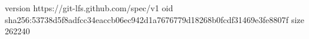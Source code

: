 version https://git-lfs.github.com/spec/v1
oid sha256:53738d5f8adfcc34eaccb06ec942d1a7676779d18268b0fcdf31469e3fe8807f
size 262240
